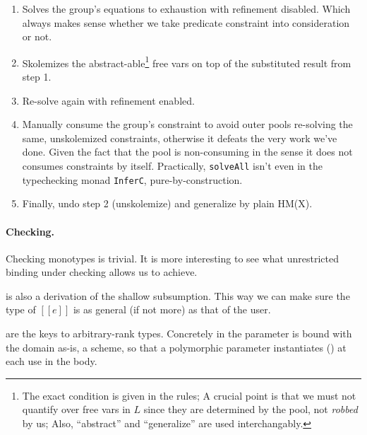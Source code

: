 \documentclass[a4paper, 11pt]{article}
\theoremstyle{remark}
\begin{document}
\begin{enumerate}
  \item Solves the group's equations to exhaustion with refinement disabled. Which always makes sense
    whether we take predicate constraint into consideration or not.
  \item Skolemizes the abstract-able\footnote{
      The exact condition is given in the rules; A crucial point is that
      we must not quantify over free vars in $L$ since they are determined
      by the pool, not \emph{robbed} by us;
      Also, ``abstract'' and ``generalize'' are used interchangably.
    }
    free vars on top of the substituted result from step 1.
  \item Re-solve again with refinement enabled.
  \item Manually consume the group's constraint to avoid
    outer pools re-solving the same, unskolemized constraints, otherwise it defeats
    the very work we've done. Given the fact that the pool is non-consuming in the sense it does not
    consumes constraints by itself. Practically, \texttt{solveAll} isn't even in the typechecking
    monad \texttt{InferC}, pure-by-construction.
  \item Finally, undo step 2 (unskolemize) and generalize by plain HM(X).
\end{enumerate}

\paragraph{Checking.}
Checking monotypes is trivial. It is more interesting to see what unrestricted
binding under checking allows us to achieve.

 is also a derivation of the shallow subsumption.
This way we can make sure the type of $[[e]]$
is as general (if not more) as that of the user.

 are the keys to arbitrary-rank types. Concretely in 
the parameter is bound with the domain as-is, a scheme, so that a polymorphic parameter
instantiates () at each use in the body.
\end{document}
